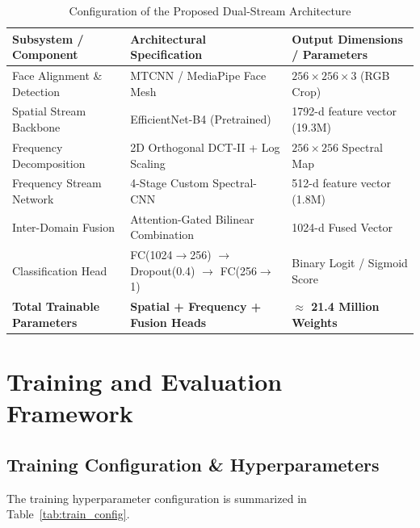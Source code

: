 \documentclass[12pt,a4paper]{report}
\begin{document}
\begin{table}[htbp]
\centering
\small
\caption{Configuration of the Proposed Dual-Stream Architecture}
\label{tab:model_config}
\begin{tabular}{p{4.5cm} p{5.0cm} p{4.5cm}}
\toprule
\textbf{Subsystem / Component} & \textbf{Architectural Specification} & \textbf{Output Dimensions / Parameters} \\
\midrule
Face Alignment \& Detection & MTCNN / MediaPipe Face Mesh & $256 \times 256 \times 3$ (RGB Crop) \\
Spatial Stream Backbone & EfficientNet-B4 (Pretrained) & 1792-d feature vector (19.3M) \\
Frequency Decomposition & 2D Orthogonal DCT-II + Log Scaling & $256 \times 256$ Spectral Map \\
Frequency Stream Network & 4-Stage Custom Spectral-CNN & 512-d feature vector (1.8M) \\
Inter-Domain Fusion & Attention-Gated Bilinear Combination & 1024-d Fused Vector \\
Classification Head & FC(1024$\to$256) $\to$ Dropout(0.4) $\to$ FC(256$\to$1) & Binary Logit / Sigmoid Score \\
\midrule
\textbf{Total Trainable Parameters} & \textbf{Spatial + Frequency + Fusion Heads} & \textbf{$\approx$ 21.4 Million Weights} \\
\bottomrule
\end{tabular}
\end{table}

\newpage

\chapter{Training and Evaluation Framework}

\section{Training Configuration \& Hyperparameters}
The training hyperparameter configuration is summarized in Table~\ref{tab:train_config}.
\end{document}
